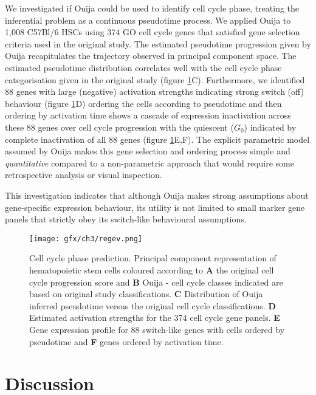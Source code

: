 We investigated if Ouija could be used to identify cell cycle phase, treating the inferential problem as a continuous pseudotime process. We applied Ouija to 1,008 C57Bl/6 HSCs using 374 GO cell cycle genes that satisfied gene selection criteria used in the original study. The estimated pseudotime progression given by Ouija recapitulates the  trajectory observed in principal component space. The estimated pseudotime distribution correlates well with the cell cycle phase categorisation  given in the original study (figure \ref{fig:regev}C). Furthermore, we identified 88 genes with large (negative) activation strengths indicating strong switch (off) behaviour (figure \ref{fig:regev}D) ordering the cells according to pseudotime and then ordering by activation time shows a cascade of expression inactivation across these 88 genes over cell cycle progression with the quiescent ($G_0$) indicated by complete inactivation of all 88 genes (figure \ref{fig:regev}E,F). The explicit parametric model assumed by Ouija makes this gene selection and ordering process simple and \emph{quantitative} compared to a non-parametric approach that would require some retrospective analysis or visual inspection.

This investigation indicates that although Ouija makes strong assumptions about gene-specific expression behaviour, its utility is not limited to small marker gene panels that strictly obey its switch-like behavioural assumptions.

\begin{figure}
	\texttt{[image: gfx/ch3/regev.png]}
	\caption[Cell cycle phase prediction.]{Cell cycle phase prediction. Principal component representation of hematopoietic stem cells coloured according to \textbf{A} the original cell cycle progression score \cite{Kowalczyk2015-li} and \textbf{B} Ouija - cell cycle classes indicated are based on original study classifications. \textbf{C} Distribution of Ouija inferred pseudotime versus the original cell cycle classifications. \textbf{D} Estimated activation strengths for the 374 cell cycle gene panels. \textbf{E} Gene expression profile for 88 switch-like genes with cells ordered by pseudotime and \textbf{F} genes ordered by activation time.}
	\label{fig:regev}
\end{figure}




\section{Discussion}

